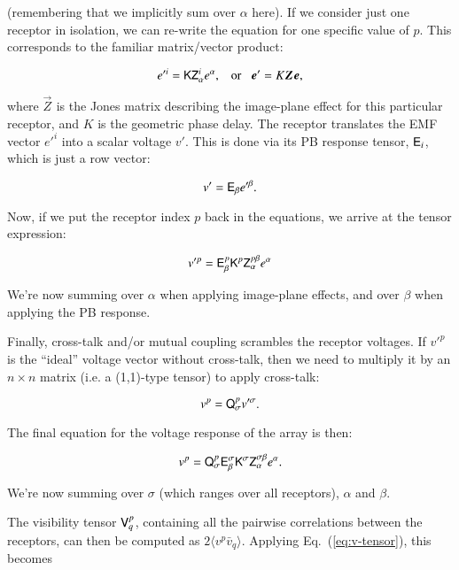 \documentclass{aa}
\newcommand{\jones}[2]{\vec {#1}_{#2}}
\begin{document}
(remembering that we implicitly sum over $\alpha$ here). If we consider just one receptor in isolation, we can re-write the equation for one specific value of $p$. This corresponds to  the familiar matrix/vector product:

\[
e'^i = \tens{K}\tens{Z}_{\alpha}^{i}e^{\alpha},\;\;\;\mbox{or}\;\;\;\vec e' = K \jones{Z}{} \vec e,
\]

where $\jones{Z}{}$ is the Jones matrix describing the image-plane effect for this particular receptor, 
and $K$ is the geometric phase delay. The receptor translates the EMF vector $e'^{i}$ into a scalar voltage $v'$.  
This is done via its PB response tensor, $\mathsf{E}_i$, which is just a row vector:

\[
v'=\mathsf{E}_{\beta}e'^{\beta}.
\]


Now, if we put the receptor index $p$ back in the equations, we arrive at the tensor expression:

\begin{equation}
\label{eq:gme-deriv-EKZe}
v'^{p}=\mathsf{E}_{\beta}^{p}\mathsf{K}^{p}\mathsf{Z}_{\alpha}^{p\beta}e^{\alpha}
\end{equation}

We're now summing over $\alpha$ when applying image-plane effects, and over $\beta$ when applying the PB response.

Finally, cross-talk and/or mutual coupling scrambles the receptor voltages. If $v'^{p}$
is the ``ideal'' voltage vector without cross-talk, then we need to multiply it by an $n\times n$ matrix (i.e. a (1,1)-type tensor)
to apply cross-talk:

\begin{equation}
\label{eq:gme-deriv-Qv}
v^{p}=\mathsf{Q}_{\sigma}^{p}v'^{\sigma}.
\end{equation}

The final equation for the voltage response of the array is then:

\begin{equation}
v^{p}=\mathsf{Q}_{\sigma}^{p}\mathsf{E}_{\beta}^{\sigma}\mathsf{K}^{\sigma}\mathsf{Z}_{\alpha}^{\sigma\beta} e^{\alpha}.
\label{eq:v-tensor}
\end{equation}


We're now summing over $\sigma$ (which ranges over all receptors), $\alpha$ and $\beta$. 

The visibility tensor $\mathsf{V}^p_q$, containing all the pairwise correlations between the receptors, can then be computed as 
$2\langle v^{p}\bar{v}_{q} \rangle$. Applying Eq.~(\ref{eq:v-tensor}), this becomes
\end{document}
